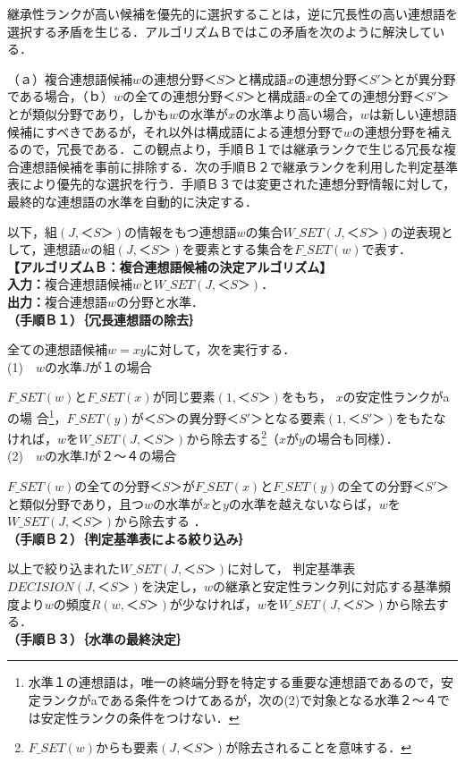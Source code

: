 継承性ランクが高い候補を優先的に選択することは，逆に冗長性の高い連想語を選択する矛盾を生じる．アルゴリズムＢではこの矛盾を次のように解決している．

（ａ）複合連想語候補$w$の連想分野$＜S＞$と構成語$x$の連想分野$＜S'＞$とが異分野\mbox{である場}合，（ｂ）$w$の全ての連想分野$＜S＞$と構成語$x$の全ての連想分野$＜S'＞$\mbox{とが類似分野であり，}しかも$w$の水準が$x$の水準より高い場合，$w$は新しい連想語候補にすべきであるが，それ以外は構成語による連想分野で$w$の連想分野を補えるので，冗長である．この観点より，手順Ｂ１では継承ランクで生じる冗長な複合連想語候補を事前に排除する．次の手順Ｂ２で継承ランクを利用した判定基準表により優先的な選択を行う．手順Ｂ３では変更された連想分野情報に対して，最終的な連想語の水準を自動的に決定する．

以下，組$(J,＜S＞)$の情報をもつ連想語$w$の集合$W\_SET(J,＜S＞)$の逆表現として，\mbox{連想}語$w$の組$(J,＜S＞)$を要素とする集合を$F\_SET(w)$で表す．\\
{\bf 【アルゴリズムＢ：複合連想語候補の決定アルゴリズム】}\\
{\bf 入力：}複合連想語候補$w$と$W\_SET(J,＜S＞)$．\\
{\bf 出力：}複合連想語$w$の分野と水準．\\
{\bf （手順Ｂ１）｛冗長連想語の除去｝}

全ての連想語候補$w=xy$に対して，次を実行する．\\
(1)　$w$の水準$J$が１の場合 

$F\_SET(w)$と$F\_SET(x)$が同じ要素$(1, ＜S＞)$をもち，
$x$の安定性ランクがaの場\break
合\footnote{水準１の連想語は，唯一の終端分野を特定する重要な連想語であるので，安定ランクがaである条件をつけてあるが，次の(2)で対象となる水準２〜４では安定性ランクの条件をつけない．}，$F\_SET(y)$が$＜S＞$の異分野$＜S'＞$となる要素$(1, ＜S'＞)$をもたなければ，$w$を$W\_SET(J,＜S＞)$から除去する\footnote{$F\_SET(w)$からも要素$(J,＜S＞)$が除去されることを意味する．}（$x$が$y$の場合も同様）．\\
(2)　$w$の水準Jが２〜４の場合

$F\_SET(w)$の全ての分野$＜S＞$が$F\_SET(x)$と$F\_SET(y)$の全ての分野$＜S'＞$と\mbox{類似分野}であり，且つ$w$の水準が$x$と$y$の水準を越えないならば，$w$を$W\_SET(J,＜S＞)$から\mbox{除去する} ．\\
{\bf （手順Ｂ２）｛判定基準表による絞り込み｝}

以上で絞り込まれた$W\_SET(J,＜S＞)$に対して，
判定基準表$DECISION(J,＜S＞)$\mbox{を決}定し，$w$の継承と安定性ランク列に対応する基準頻度より$w$の頻度$R(w,＜S＞)$が\mbox{少なければ}，$w$を$W\_SET(J,＜S＞)$から除去する．\\
{\bf （手順Ｂ３）｛水準の最終決定｝}


